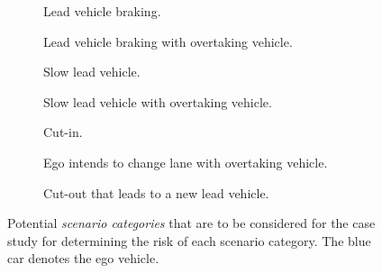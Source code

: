 \documentclass[10pt,final,a4paper,oneside,onecolumn]{article}
\newlength{\figurewidth}
\begin{document}
\setlength{\figurewidth}{0.49\textwidth}
\begin{figure}
	\begin{subfigure}{0.49\textwidth}
		
		\vspace{-1em}
		\caption{Lead vehicle braking.}
		\vspace{1em}
	\end{subfigure}
	\begin{subfigure}{0.49\textwidth}
		
		\vspace{-1em}
		\caption{Lead vehicle braking with overtaking vehicle.}
		\vspace{1em}
	\end{subfigure}
	\begin{subfigure}{0.49\textwidth}
		
		\vspace{-1em}
		\caption{Slow lead vehicle.}
		\vspace{1em}
	\end{subfigure}
	\begin{subfigure}{0.49\textwidth}
		
		\vspace{-1em}
		\caption{Slow lead vehicle with overtaking vehicle.}
		\vspace{1em}
	\end{subfigure}
	\begin{subfigure}{0.49\textwidth}
		
		\vspace{-1em}
		\caption{Cut-in.}
		\vspace{2em}
	\end{subfigure}
	\begin{subfigure}{0.49\textwidth}
		
		\vspace{-1em}
		\caption{Ego intends to change lane with overtaking vehicle.}
		\vspace{1em}
	\end{subfigure}
	\begin{subfigure}{0.49\textwidth}
		
		\vspace{-1em}
		\caption{Cut-out that leads to a new lead vehicle.}
		\vspace{1em}
	\end{subfigure}
	\caption{Potential \emph{scenario categories} that are to be considered for the case study for determining the risk of each scenario category. The blue car denotes the ego vehicle.}
	\label{fig:scenarios}
\end{figure}
\end{document}
